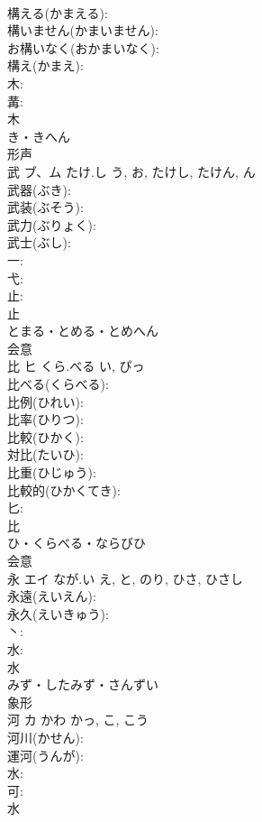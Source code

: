\documentclass[8pt]{extreport}
\begin{document}
\begin{CJK}{UTF8}{min}
\\	構える(かまえる): 
\\	構いません(かまいません): 
\\	お構いなく(おかまいなく): 
\\	構え(かまえ): 
\\	木: 
\\	冓: 
\\	木	
\\	き・きへん	
\\	形声 
\\	武	ブ、ム	たけ.し	う, お, たけし, たけん, ん	
\\	武器(ぶき): 
\\	武装(ぶそう): 
\\	武力(ぶりょく): 
\\	武士(ぶし): 
\\	一: 
\\	弋: 
\\	止: 
\\	止	
\\	とまる・とめる・とめへん	
\\	会意 
\\	比	ヒ	くら.べる	い, ぴっ	
\\	比べる(くらべる): 
\\	比例(ひれい): 
\\	比率(ひりつ): 
\\	比較(ひかく): 
\\	対比(たいひ): 
\\	比重(ひじゅう): 
\\	比較的(ひかくてき): 
\\	匕: 
\\	比	
\\	ひ・くらべる・ならびひ	
\\	会意 
\\	永	エイ	なが.い	え, と, のり, ひさ, ひさし	
\\	永遠(えいえん): 
\\	永久(えいきゅう): 
\\	丶: 
\\	水: 
\\	水	
\\	みず・したみず・さんずい	
\\	象形 
\\	河	カ	かわ	かっ, こ, こう	
\\	河川(かせん): 
\\	運河(うんが): 
\\	水: 
\\	可: 
\\	水	

\end{CJK}
\end{document}
